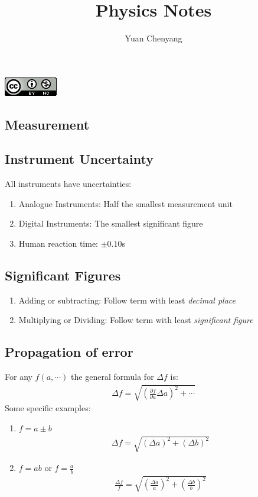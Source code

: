\documentclass[11pt]{article}
\title{Physics Notes}
\author{Yuan Chenyang}
\makeatletter
\renewcommand\tableofcontents{%
    \@starttoc{toc}%
}
\newcommand{\pd}[2]{
  \ensuremath{
    \frac{\partial #1}{\partial #2} }} %
\makeatother
\begin{document}
\maketitle
\begin{center}
\includegraphics[scale=0.7]{deed.png} 
\end{center}

\begin{multicols*}{2}
\tableofcontents
\end{multicols*}
\newpage

\begin{multicols*}{3}
\section{Measurement}
\subsection{Instrument Uncertainty}
All instruments have uncertainties:
\begin{enumerate}
\item Analogue Instruments: Half the smallest measurement unit
\item Digital Instruments: The smallest significant figure
\item Human reaction time: $\pm 0.10$s
\end{enumerate}
\subsection{Significant Figures}
\begin{enumerate}
\item Adding or subtracting: Follow term with least {\em decimal place}
\item Multiplying or Dividing: Follow term with least {\em significant figure}
\end{enumerate}
\subsection{Propagation of error}
For any $f(a, \cdots)$ the general formula for $\Delta f$ is:
\begin{align*}
\Delta f = \sqrt{\left( \pd{f}{a} \Delta a \right)^2 + \cdots}
\end{align*}
Some specific examples:
\begin{enumerate}
\item $f=a\pm b$
\begin{align*}
\Delta f = \sqrt{(\Delta a)^2+(\Delta b)^2}
\end{align*}
\item $f=ab$ or $f=\frac{a}{b}$
\begin{align*}
\frac{\Delta f}{f} = \sqrt{\left(\frac{\Delta a}{a} \right)^2+\left(\frac{\Delta b}{b} \right)^2}
\end{align*}
\end{enumerate}

\end{multicols*}
\end{document}
